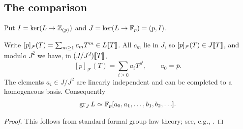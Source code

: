 \subsection{The comparison}\label{app:rw-comparison}

Put $I=\ker(L\to\mathbb{Z}_{(p)})$ and $J=\ker(L\to\mathbb{F}_p)=(p,I)$.

\begin{lemma}\label{lemm:coefficients}
Write $[p]_{\mathcal F}(T)=\sum_{m\ge1}c_mT^m\in L\llbracket T \rrbracket$. All $c_m$ lie in $J$, so $[p]_{\mathcal F}(T)\in J\llbracket T \rrbracket$, and modulo $J^2$ we have, in $(J/J^2)\llbracket T \rrbracket$,
\[ [p]_{\mathcal F}(T)=\sum_{i\ge0}a_iT^{p^i},\qquad a_0=\bar p. \]
The elements $a_i\in J/J^2$ are linearly independent and can be completed to a homogeneous basis. Consequently
\[\operatorname{gr}_J L\simeq \mathbb{F}_p[a_0,a_1,\ldots,b_1,b_2,\ldots].\]
\end{lemma}
\begin{proof}
This follows from standard formal group law theory; see, e.g., \cite[Appendix A2.1--A2.2]{ravenel1986complex}.
\end{proof}

